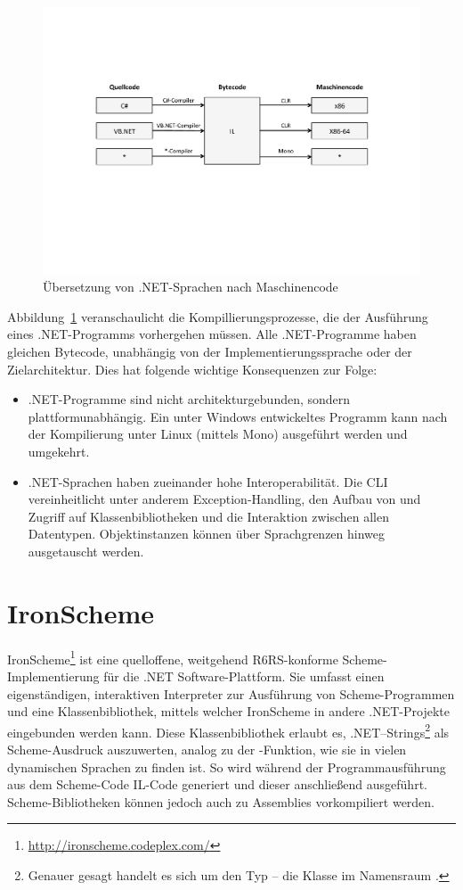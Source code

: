 \begin{figure}
	\centering
	\includegraphics[width=0.9\linewidth]{figures/common-language-infrastructure.pdf}
	\caption{Übersetzung von .NET-Sprachen nach Maschinencode}
	\label{fig:cli}
\end{figure}

Abbildung~\ref{fig:cli} veranschaulicht die Kompillierungsprozesse, die der Ausführung eines .NET-Programms vorhergehen müssen. Alle .NET-Programme haben gleichen Bytecode, unabhängig von der Implementierungssprache oder der Zielarchitektur. Dies hat folgende wichtige Konsequenzen zur Folge:

\begin{itemize}
	\item .NET-Programme sind nicht architekturgebunden, sondern plattformunabhängig. Ein unter Windows entwickeltes Programm kann nach der Kompilierung unter Linux (mittels Mono) ausgeführt werden und umgekehrt.
	\item .NET-Sprachen haben zueinander hohe Interoperabilität. Die CLI vereinheitlicht unter anderem Exception-Handling, den Aufbau von und Zugriff auf Klassenbibliotheken und die Interaktion zwischen allen Datentypen. Objektinstanzen können über Sprachgrenzen hinweg ausgetauscht werden.
\end{itemize}

\section{IronScheme}

IronScheme\footnote{\url{http://ironscheme.codeplex.com/}} ist eine quelloffene, weitgehend R6RS-konforme Scheme-Implementierung für die .NET Software-Plattform. Sie umfasst einen eigenständigen, interaktiven Interpreter zur Ausführung von Scheme-Programmen und eine Klassenbibliothek, mittels welcher IronScheme in andere .NET-Projekte eingebunden werden kann. Diese Klassenbibliothek erlaubt es, .NET–Strings\footnote{Genauer gesagt handelt es sich um den Typ  – die Klasse  im Namensraum .} als Scheme-Ausdruck auszuwerten, analog zu der -Funktion, wie sie in vielen dynamischen Sprachen zu finden ist. So wird während der Programmausführung aus dem Scheme-Code IL-Code generiert und dieser anschließend ausgeführt. Scheme-Bibliotheken können jedoch auch zu Assemblies vorkompiliert werden.

